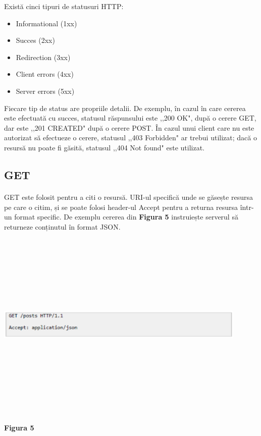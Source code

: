 Există cinci tipuri de statusuri HTTP:

\begin{itemize}
\item Informational (1xx)
\item Succes (2xx)
\item Redirection (3xx)
\item Client errors (4xx)
\item Server errors (5xx)
\end{itemize}

Fiecare tip de status are propriile detalii. De exemplu, în cazul în care cererea este efectuată cu succes, statusul răspunsului este ,,200 OK", după o cerere GET, dar este ,,201 CREATED" după o cerere POST. În cazul unui client care nu este autorizat să efectueze o cerere, statusul ,,403 Forbidden" ar trebui utilizat; dacă o resursă nu poate fi găsită, statusul ,,404 Not found" este utilizat.

\subsection{GET}
\paragraph{} GET este folosit pentru a citi o resursă. URI-ul specifică unde se găsește resursa pe care o citim, și se poate folosi header-ul Accept pentru a returna resursa într-un format specific. De exemplu cererea din \textbf{Figura 5} instruiește serverul să returneze conținutul în format JSON.


\vspace{1cm}

\begin{center}
\includegraphics[width=12cm,height=9cm,keepaspectratio]{imagini/Get1.eps} %
\paragraph{} \textbf{Figura 5}
\end{center}

